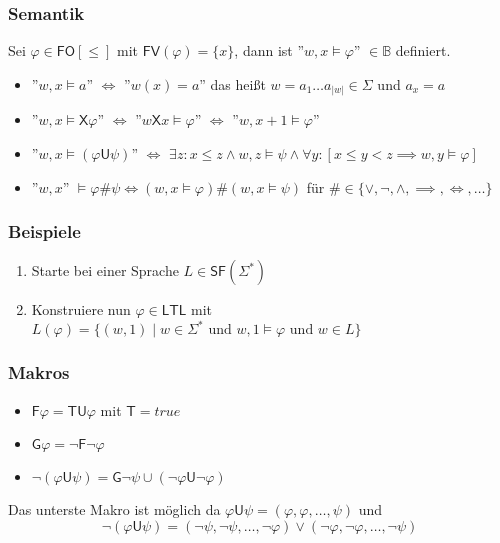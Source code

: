 \documentclass[12pt, german]{article}
\newcommand{\B}{\mathbb{B}}
\newcommand{\sigstern}{\Sigma^\ast}
\newcommand{\starfree}{\mathsf{SF}}
\newcommand{\fv}{\mathsf{FV}}
\newcommand{\fo}{\mathsf{FO}}
\newcommand{\ltl}{\mathsf{LTL}}
\newcommand{\sX}{\mathsf{X}}
\newcommand{\sF}{\mathsf{F}}
\newcommand{\sG}{\mathsf{G}}
\newcommand{\sT}{\mathsf{T}}
\newcommand{\sU}{\mathsf{U}}
\begin{document}
\subsubsection{Semantik}
	Sei $\varphi \in \fo[\leq]$ mit $\fv(\varphi) = \{x\}$, dann ist ''$w,x \models \varphi$'' $\in \B$ definiert.
	\begin{itemize}
		\item ''$w,x \models a$'' $\iff$ ''$w(x) = a$'' das heißt $w = a_1 \ldots a_{|w|} \in \Sigma$ und $a_x = a$
		\item ''$w,x \models \sX \varphi$'' $\iff$ ''$w\sX x \models \varphi$'' $\iff$ ''$w, x+1 \models \varphi$''
		\item ''$w, x \models (\varphi \sU \psi)$'' $\iff$ $\exists z : x \leq z \land w, z \models \psi \land \forall y: [x \leq y < z \implies w, y \models \varphi]$
		\item ''$w,x$'' $\models \varphi \#\psi \iff (w,x \models \varphi) \# (w,x \models \psi )$ für $\# \in \{\lor, \neg, \land, \implies, \iff, \ldots\}$
	\end{itemize}

\subsubsection{Beispiele}
		\begin{enumerate}[label=\arabic*.)]
			\item Starte bei einer Sprache $L \in \starfree(\sigstern)$
			\item Konstruiere nun $\varphi \in \ltl$ mit $L(\varphi) = \{(w,1) \mid w \in \sigstern \text{ und } w,1 \models \varphi \text{ und } w \in L\}$
		\end{enumerate}
\subsubsection{Makros}
		\begin{itemize}
		\item $\sF \varphi = \sT \sU \varphi$ mit $\sT = true$
		\item $\sG \varphi = \neg \sF \neg \varphi$
		\item $\neg(\varphi \sU \psi) = \sG \neg \psi \cup (\neg \varphi \sU \neg \varphi)$
	\end{itemize}
Das unterste Makro ist möglich da $\varphi \sU \psi = (\varphi, \varphi, \ldots,\psi)$ und $$\neg (\varphi \sU \psi) = (\neg \psi, \neg \psi, \ldots, \neg\varphi) \lor (\neg \varphi, \neg \varphi, \ldots, \neg\psi)$$
\end{document}
